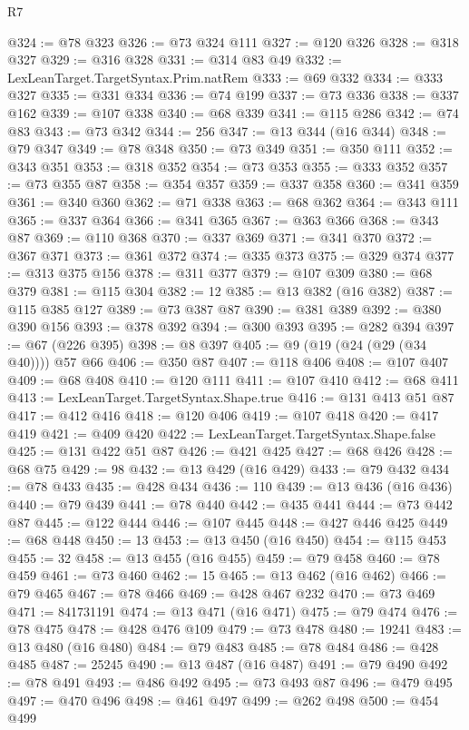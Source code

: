\begin{lexlean}{R7}
\begin{coremodule}
@324 := @78 @323
@326 := @73 @324 @111
@327 := @120 @326
@328 := @318 @327
@329 := @316 @328
@331 := @314 @83 @49
@332 := LexLeanTarget.TargetSyntax.Prim.natRem
@333 := @69 @332
@334 := @333 @327
@335 := @331 @334
@336 := @74 @199
@337 := @73 @336
@338 := @337 @162
@339 := @107 @338
@340 := @68 @339
@341 := @115 @286
@342 := @74 @83
@343 := @73 @342
@344 := 256
@347 := @13 @344 (@16 @344)
@348 := @79 @347
@349 := @78 @348
@350 := @73 @349
@351 := @350 @111
@352 := @343 @351
@353 := @318 @352
@354 := @73 @353
@355 := @333 @352
@357 := @73 @355 @87
@358 := @354 @357
@359 := @337 @358
@360 := @341 @359
@361 := @340 @360
@362 := @71 @338
@363 := @68 @362
@364 := @343 @111
@365 := @337 @364
@366 := @341 @365
@367 := @363 @366
@368 := @343 @87
@369 := @110 @368
@370 := @337 @369
@371 := @341 @370
@372 := @367 @371
@373 := @361 @372
@374 := @335 @373
@375 := @329 @374
@377 := @313 @375 @156
@378 := @311 @377
@379 := @107 @309
@380 := @68 @379
@381 := @115 @304
@382 := 12
@385 := @13 @382 (@16 @382)
@387 := @115 @385 @127
@389 := @73 @387 @87
@390 := @381 @389
@392 := @380 @390 @156
@393 := @378 @392
@394 := @300 @393
@395 := @282 @394
@397 := @67 (@226 @395)
@398 := @8 @397
@405 := @9 (@19 (@24 (@29 (@34 @40)))) @57 @66
@406 := @350 @87
@407 := @118 @406
@408 := @107 @407
@409 := @68 @408
@410 := @120 @111
@411 := @107 @410
@412 := @68 @411
@413 := LexLeanTarget.TargetSyntax.Shape.true
@416 := @131 @413 @51 @87
@417 := @412 @416
@418 := @120 @406
@419 := @107 @418
@420 := @417 @419
@421 := @409 @420
@422 := LexLeanTarget.TargetSyntax.Shape.false
@425 := @131 @422 @51 @87
@426 := @421 @425
@427 := @68 @426
@428 := @68 @75
@429 := 98
@432 := @13 @429 (@16 @429)
@433 := @79 @432
@434 := @78 @433
@435 := @428 @434
@436 := 110
@439 := @13 @436 (@16 @436)
@440 := @79 @439
@441 := @78 @440
@442 := @435 @441
@444 := @73 @442 @87
@445 := @122 @444
@446 := @107 @445
@448 := @427 @446 @425
@449 := @68 @448
@450 := 13
@453 := @13 @450 (@16 @450)
@454 := @115 @453
@455 := 32
@458 := @13 @455 (@16 @455)
@459 := @79 @458
@460 := @78 @459
@461 := @73 @460
@462 := 15
@465 := @13 @462 (@16 @462)
@466 := @79 @465
@467 := @78 @466
@469 := @428 @467 @232
@470 := @73 @469
@471 := 841731191
@474 := @13 @471 (@16 @471)
@475 := @79 @474
@476 := @78 @475
@478 := @428 @476 @109
@479 := @73 @478
@480 := 19241
@483 := @13 @480 (@16 @480)
@484 := @79 @483
@485 := @78 @484
@486 := @428 @485
@487 := 25245
@490 := @13 @487 (@16 @487)
@491 := @79 @490
@492 := @78 @491
@493 := @486 @492
@495 := @73 @493 @87
@496 := @479 @495
@497 := @470 @496
@498 := @461 @497
@499 := @262 @498
@500 := @454 @499

\end{coremodule}
\end{lexlean}
